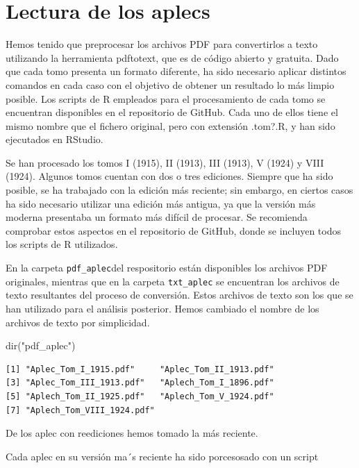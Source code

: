 \documentclass[
  letterpaper,
  DIV=11,
  numbers=noendperiod]{scrreprt}
\newenvironment{Shaded}{\begin{snugshade}}{\end{snugshade}}
\newcommand{\FunctionTok}[1]{\textcolor[rgb]{0.28,0.35,0.67}{#1}}
\newcommand{\NormalTok}[1]{\textcolor[rgb]{0.00,0.23,0.31}{#1}}
\newcommand{\StringTok}[1]{\textcolor[rgb]{0.13,0.47,0.30}{#1}}
\begin{document}
\chapter{Lectura de los aplecs}\label{lectura-de-los-aplecs}

Hemos tenido que preprocesar los archivos PDF para convertirlos a texto
utilizando la herramienta pdftotext, que es de código abierto y
gratuita. Dado que cada tomo presenta un formato diferente, ha sido
necesario aplicar distintos comandos en cada caso con el objetivo de
obtener un resultado lo más limpio posible. Los scripts de R empleados
para el procesamiento de cada tomo se encuentran disponibles en el
repositorio de GitHub. Cada uno de ellos tiene el mismo nombre que el
fichero original, pero con extensión .tom?.R, y han sido ejecutados en
RStudio.

Se han procesado los tomos I (1915), II (1913), III (1913), V (1924) y
VIII (1924). Algunos tomos cuentan con dos o tres ediciones. Siempre que
ha sido posible, se ha trabajado con la edición más reciente; sin
embargo, en ciertos casos ha sido necesario utilizar una edición más
antigua, ya que la versión más moderna presentaba un formato más difícil
de procesar. Se recomienda comprobar estos aspectos en el repositorio de
GitHub, donde se incluyen todos los scripts de R utilizados.

En la carpeta \texttt{pdf\_aplec}del respositorio están disponibles los
archivos PDF originales, mientras que en la carpeta \texttt{txt\_aplec}
se encuentran los archivos de texto resultantes del proceso de
conversión. Estos archivos de texto son los que se han utilizado para el
análisis posterior. Hemos cambiado el nombre de los archivos de texto
por simplicidad.

\begin{Shaded}
\begin{Highlighting}[]
\FunctionTok{dir}\NormalTok{(}\StringTok{"pdf\_aplec"}\NormalTok{)}
\end{Highlighting}
\end{Shaded}

\begin{verbatim}
[1] "Aplec_Tom_I_1915.pdf"     "Aplec_Tom_II_1913.pdf"   
[3] "Aplec_Tom_III_1913.pdf"   "Aplech_Tom_I_1896.pdf"   
[5] "Aplech_Tom_II_1925.pdf"   "Aplech_Tom_V_1924.pdf"   
[7] "Aplech_Tom_VIII_1924.pdf"
\end{verbatim}

De los aplec con reediciones hemos tomado la más reciente.

Cada aplec en su versión ma´s reciente ha sido porcesosado con un script
\end{document}
